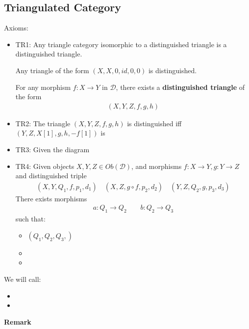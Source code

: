 \documentclass[Total.tex]{subfiles}
\begin{document}
			\subsection{Triangulated Category}
			\begin{Def}
				Axioms:
				\begin{itemize}
					\item TR1: Any triangle category isomorphic to a distinguished triangle is a distinguished triangle. 
					
					Any triangle of the form $(X,X,0,id,0,0)$ is distinguished.
					
					For any morphism $f:X\rightarrow Y$ in $\mathcal{D}$, there exists a \textbf{distinguished triangle} of the form
					\begin{gather*}
						(X,Y,Z,f,g,h)
					\end{gather*}
					\item TR2: The triangle $(X,Y,Z,f,g,h)$ is distinguished iff $(Y,Z,X[1],g,h,-f[1])$ is
					\item TR3: Given the diagram
					\begin{center}
					\end{center}
					\item TR4: Given objects $X,Y,Z\in Ob(\mathcal{D})$, and morphisms $f:X\rightarrow Y,g:Y\rightarrow Z$ and distinguished triple
					\begin{gather*}
						(X,Y,Q_1,f,p_1,d_1)\quad (X,Z,g\circ f,p_2,d_2)\quad (Y,Z,Q_2,g,p_3,d_3)
					\end{gather*}
					There exists morphisms 
					\begin{gather*}
						a:Q_1\rightarrow Q_2\qquad b:Q_2\rightarrow Q_3
					\end{gather*}
					such that:
					\begin{itemize}
						\item $(Q_1,Q_2,Q_3,)$
						\item 
						\item 
					\end{itemize}
				\end{itemize}
				We will call:
				\begin{itemize}
					\item 
					\item 
				\end{itemize}
			\end{Def}
			\textbf{Remark}
\end{document}
